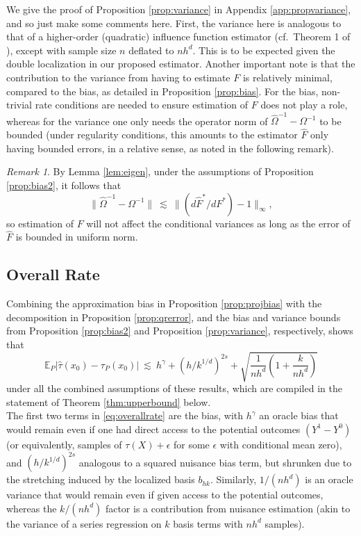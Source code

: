 \documentclass[11pt,twoside]{article}
\newcommand{\E}{\mathbb{E}}
\theoremstyle{definition}
\theoremstyle{remark}
\newtheorem{remark}{Remark}
\begin{document}
We give the proof of Proposition \ref{prop:variance} in Appendix \ref{app:propvariance}, and so just make some comments here.  First, the variance here is analogous to that of a  higher-order (quadratic) influence function estimator (cf.\ Theorem 1 of \citet{robins2009quadratic}), except with sample size $n$ deflated to $nh^d$.  This is to be expected given the double localization in our proposed estimator. Another important note is that the contribution to the variance from having to estimate $F$ is relatively minimal, compared to the bias, as detailed in Proposition \ref{prop:bias}. For the bias, non-trivial rate conditions are needed to ensure estimation of $F$ does not play a role, whereas for the variance one only needs the operator norm of $\widehat\Omega^{-1} - \Omega^{-1}$ to be bounded (under regularity conditions, this amounts to the estimator $\widehat{F}$ only having bounded errors, in a relative sense, as noted in the following remark). \\

\begin{remark}
By Lemma \ref{lem:eigen}, under the assumptions of Proposition \ref{prop:bias2}, it follows that 
$$ \| \widehat\Omega^{-1}-\Omega^{-1} \| \ \lesssim \ \| (d\widehat{F}^*/dF^*) - 1 \|_\infty , $$
so estimation of $F$ will not affect the conditional variances as long as the error of $\widehat{F}$ is bounded in uniform norm.  \\
\end{remark}

\subsection{Overall Rate} \label{sec:overallrate}

Combining the approximation bias in Proposition \ref{prop:projbias} with the decomposition in Proposition \ref{prop:qrerror}, and the bias and variance bounds from Proposition \ref{prop:bias2} and Proposition \ref{prop:variance}, respectively, shows that
\begin{equation} \label{eq:overallrate}
 \E_P | \widehat\tau(x_0) - \tau_P(x_0) |  \ \lesssim \ h^\gamma + \left( h/k^{1/d} \right)^{2s} + \sqrt{\frac{1}{nh^d} \left( 1 + \frac{k}{nh^d} \right) } 
 \end{equation}
under all the combined assumptions of these results, which are compiled in the statement of Theorem \ref{thm:upperbound} below. \\

 The first two terms in \eqref{eq:overallrate} are the bias, with $h^\gamma$ an oracle bias that would remain even if one had direct access to the potential outcomes $(Y^1-Y^0)$ (or equivalently,  samples of $\tau(X)+\epsilon$ for some $\epsilon$ with conditional mean zero), and $(h/k^{1/d})^{2s}$ analogous to a squared nuisance bias term, but shrunken due to the stretching induced by the localized basis $b_{hk}$. Similarly, $1/(nh^d)$ is an oracle variance that would remain even if given access to the potential outcomes, whereas the $k/(nh^d)$ factor is a contribution from nuisance estimation (akin to the variance of a series regression on $k$ basis terms with $nh^d$ samples). \\
\end{document}
